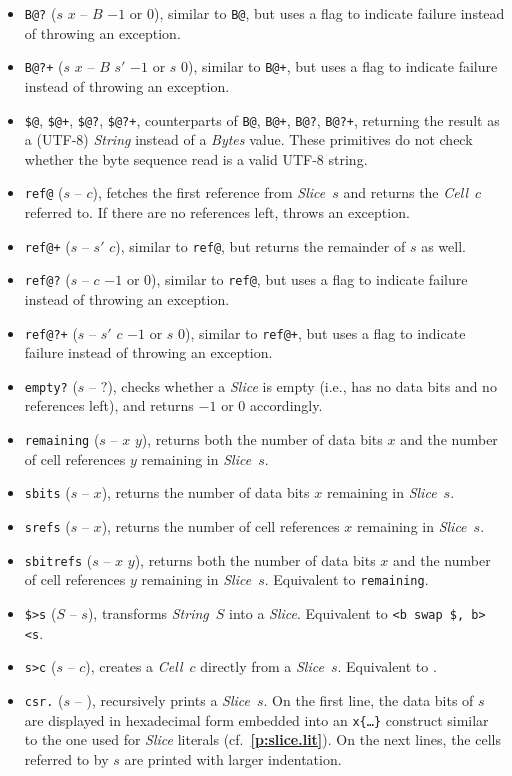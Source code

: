 \documentclass[12pt,oneside]{article}
\def\refpoint#1{{\rm\textbf{\ref{#1}}}}
\let\ptref=\refpoint
\begin{document}
\begin{itemize}
\item {\tt B@?} ($s$ $x$ -- $B$ $-1$ or $0$), similar to {\tt B@}, but uses a flag to indicate failure instead of throwing an exception.
\item {\tt B@?+} ($s$ $x$ -- $B$ $s'$ $-1$ or $s$ $0$), similar to {\tt B@+}, but uses a flag to indicate failure instead of throwing an exception.
\item {\tt \$@}, {\tt \$@+}, {\tt \$@?}, {\tt \$@?+}, counterparts of {\tt B@}, {\tt B@+}, {\tt B@?}, {\tt B@?+}, returning the result as a (UTF-8) {\em String} instead of a {\em Bytes} value. These primitives do not check whether the byte sequence read is a valid UTF-8 string.
\item {\tt ref@} ($s$ -- $c$), fetches the first reference from {\em Slice\/}~$s$ and returns the {\em Cell}~$c$ referred to. If there are no references left, throws an exception.
\item {\tt ref@+} ($s$ -- $s'$ $c$), similar to {\tt ref@}, but returns the remainder of $s$ as well.
\item {\tt ref@?} ($s$ -- $c$ $-1$ or $0$), similar to {\tt ref@}, but uses a flag to indicate failure instead of throwing an exception.
\item {\tt ref@?+} ($s$ -- $s'$ $c$ $-1$ or $s$ $0$), similar to {\tt ref@+}, but uses a flag to indicate failure instead of throwing an exception.
\item {\tt empty?} ($s$ -- $?$), checks whether a {\em Slice\/} is empty (i.e., has no data bits and no references left), and returns $-1$ or $0$ accordingly.
\item {\tt remaining} ($s$ -- $x$ $y$), returns both the number of data bits $x$ and the number of cell references $y$ remaining in {\em Slice\/}~$s$.
\item {\tt sbits} ($s$ -- $x$), returns the number of data bits $x$ remaining in {\em Slice\/}~$s$.
\item {\tt srefs} ($s$ -- $x$), returns the number of cell references $x$ remaining in {\em Slice\/}~$s$.
\item {\tt sbitrefs} ($s$ -- $x$ $y$), returns both the number of data bits $x$ and the number of cell references $y$ remaining in {\em Slice\/}~$s$. Equivalent to {\tt remaining}.
\item {\tt \$>s} ($S$ -- $s$), transforms {\em String}~$S$ into a {\em Slice}. Equivalent to {\tt <b swap \$, b> <s}.
\item {\tt s>c} ($s$ -- $c$), creates a {\em Cell}~$c$ directly from a {\em Slice}~$s$. Equivalent to {\tt <b swap s, b>}.
\item {\tt csr.} ($s$ -- ), recursively prints a {\em Slice}~$s$. On the first line, the data bits of $s$ are displayed in hexadecimal form embedded into an {\tt x\{\dots\}} construct similar to the one used for {\em Slice\/} literals (cf.~\ptref{p:slice.lit}). On the next lines, the cells referred to by $s$ are printed with larger indentation.
\end{itemize}
\end{document}
